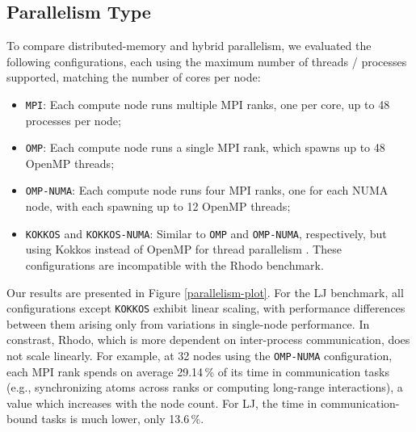 \documentclass[sigplan, nonacm, screen]{acmart}
\begin{document}
\subsection{Parallelism Type} %
\label{tuning-parallelism-type}

To compare distributed-memory and hybrid parallelism, we evaluated the following configurations,
each using the maximum number of threads / processes supported, matching the number of cores per
node:

\begin{itemize}
    \item \texttt{MPI}: Each compute node runs multiple MPI ranks, one per core, up to 48 processes
                        per node;

    \item \texttt{OMP}: Each compute node runs a single MPI rank, which spawns up to 48 OpenMP
                        threads;

    \item \texttt{OMP-NUMA}: Each compute node runs four MPI ranks, one for each NUMA node, with
                             each spawning up to 12 OpenMP threads;

    \item \texttt{KOKKOS} and \texttt{KOKKOS-NUMA}: Similar to \texttt{OMP} and \texttt{OMP-NUMA},
                                                    respectively, but using Kokkos instead of OpenMP
                                                    for thread parallelism \cite{kokkos}. These
                                                    configurations are incompatible with the Rhodo
                                                    benchmark.
\end{itemize}

Our results are presented in Figure \ref{parallelism-plot}. For the LJ benchmark, all configurations
except \texttt{KOKKOS} exhibit linear scaling, with performance differences between them arising
only from variations in single-node performance. In constrast, Rhodo, which is more dependent on
inter-process communication, does not scale linearly. For example, at 32 nodes using the
\texttt{OMP-NUMA} configuration, each MPI rank spends on average 29.14\,\% of its time in
communication tasks (e.g., synchronizing atoms across ranks or computing long-range interactions), a
value which increases with the node count. For LJ, the time in communication-bound tasks is much
lower, only 13.6\,\%.
\end{document}

